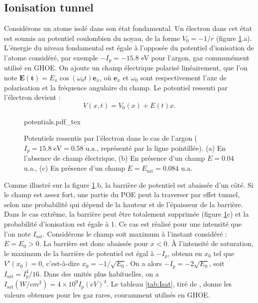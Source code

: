 \subsection{Ionisation tunnel}
Considérons un atome isolé dans son état fondamental. Un électron dans cet état est soumis au potentiel coulombien du noyau, de la forme $V_0 = -1/r$ (figure \ref{fig:ionization}.a). L'énergie du niveau fondamental est égale à l'opposée du potentiel d'ionisation de l'atome considéré, par exemple $-I_p=-15.8$ eV pour l'argon, gaz communément utilisé en GHOE. On ajoute un champ électrique polarisé linéairement, que l'on note $\bm{E(t)} = E_x \cos(\omega_0 t)\bm{e}_x$, où $\bm{e}_x$ et $\omega_0$ sont respectivement l'axe de polarisation et la fréquence angulaire du champ. Le potentiel ressenti par l'électron devient :
\begin{equation}
V(x,t) = V_0(x) + E(t)x.
\end{equation} 

\begin{figure}[!ht]
\centering
\def\svgwidth{\columnwidth}
{potentials.pdf_tex}
\caption{Potentiels ressentis par l'électron dans le cas de l'argon ($I_p = 15.8\; \text{eV} = 0.58\; \text{u.a.}$, représenté par la ligne pointillée). (a) En l'absence de champ électrique, (b) En présence d'un champ $E=0.04$ u.a., (c) En présence d'un champ $E=E_{\text{sat}}=0.084$ u.a.}
\label{fig:ionization}
\end{figure}

Comme illustré sur la figure \ref{fig:ionization}.b, la barrière de potentiel est abaissée d'un côté. Si le champ est assez fort, une partie du POE peut la traverser par effet tunnel, selon une probabilité qui dépend de la hauteur et de l'épaisseur de la barrière. Dans le cas extrême, la barrière peut être totalement supprimée (figure \ref{fig:ionization}c) et la probabilité d'ionisation est égale à 1. Ce cas est réalisé pour une intensité que l'on note $I_\text{sat}$. Considérons le champ soit maximum à l'instant considéré : $E=E_0>0$. La barrière est donc abaissée pour $x<0$. \`A l'intensité de saturation, le maximum de la barrière de potentiel est égal à $-I_p$, obtenu en $x_0$ tel que $V'(x_0) = 0$, c'est-à-dire $x_0 = -1/\sqrt{E_0}$. On a alors $-I_p = -2\sqrt{E_0}$, soit $I_\text{sat} = I_p^4/16$. Dans des unités plus habituelles, on a $I_\text{sat}(\si{W/cm^2}) = 4\times10^9I_p(\si{eV})^4$. Le tableau \ref{tab:Isat}, tiré de , donne les valeurs obtenues pour les gaz rares, couramment utilisés en GHOE.

